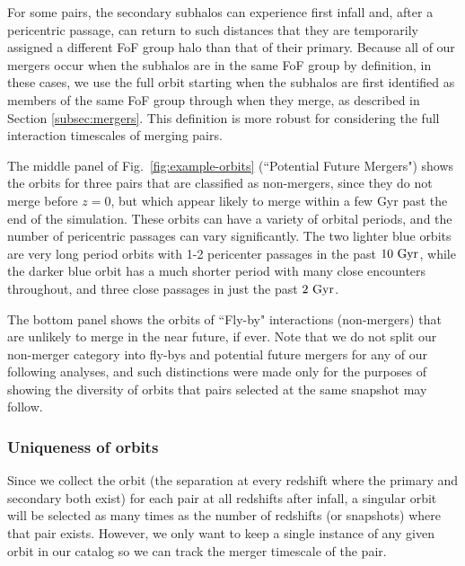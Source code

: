 \documentclass[twocolumn,linenumbers]{aastex631}
\begin{document}
For some pairs, the secondary subhalos can experience first infall and, after a pericentric passage, can return to such distances that they are temporarily assigned a different FoF group halo than that of their primary. 
Because all of our mergers occur when the subhalos are in the same FoF group by definition, in these cases, we use the full orbit starting when the subhalos are first identified as members of the same FoF group through when they merge, as described in Section \ref{subsec:mergers}.
This definition is more robust for considering the full interaction timescales of merging pairs.

The middle panel of Fig.~\ref{fig:example-orbits} (``Potential Future Mergers") shows the orbits for three pairs that are classified as non-mergers, since they do not merge before $z=0$, but which appear likely to merge within a few Gyr past the end of the simulation. 
These orbits can have a variety of orbital periods, and the number of pericentric passages can vary significantly. 
The two lighter blue orbits are very long period orbits with 1-2 pericenter passages in the past $10\,\mathrm{\,Gyr}$, while the darker blue orbit has a much shorter period with many close encounters throughout, and three close passages in just the past $2\,\mathrm{\,Gyr}$.

The bottom panel shows the orbits of ``Fly-by" interactions (non-mergers) that are unlikely to merge in the near future, if ever.  
Note that we do not split our non-merger category into fly-bys and potential future mergers for any of our following analyses, and such distinctions were made only for the purposes of showing the diversity of orbits that pairs selected at the same snapshot may follow.


\subsubsection{Uniqueness of orbits}
\label{sec:methods-unique}
Since we collect the orbit (the separation at every redshift where the primary and secondary both exist) for each pair at all redshifts after infall, a singular orbit will be selected as many times as the number of redshifts (or snapshots) where that pair exists. However, we only want to keep a single instance of any given orbit in our catalog so we can track the merger timescale of the pair.
\end{document}
